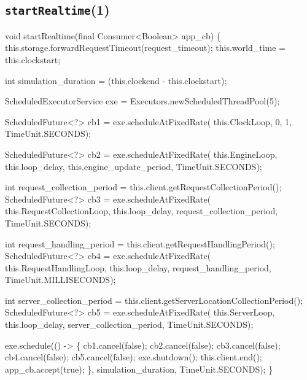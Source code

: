 \subsection{{\tt{}\protect{}startRealtime}(1)}
\nwenddocs{}\endmoddef{}
void startRealtime(final Consumer<Boolean> app_cb) \{
  this.storage.forwardRequestTimeout(request_timeout);
  this.world_time = this.clockstart;

  int simulation_duration = (this.clockend - this.clockstart);

  ScheduledExecutorService exe = Executors.newScheduledThreadPool(5);

  ScheduledFuture<?> cb1 = exe.scheduleAtFixedRate(
    this.ClockLoop, 0, 1, TimeUnit.SECONDS);

  ScheduledFuture<?> cb2 = exe.scheduleAtFixedRate(
    this.EngineLoop, this.loop_delay, this.engine_update_period, TimeUnit.SECONDS);

  int request_collection_period = this.client.getRequestCollectionPeriod();
  ScheduledFuture<?> cb3 = exe.scheduleAtFixedRate(
    this.RequestCollectionLoop, this.loop_delay, request_collection_period, TimeUnit.SECONDS);

  int request_handling_period = this.client.getRequestHandlingPeriod();
  ScheduledFuture<?> cb4 = exe.scheduleAtFixedRate(
    this.RequestHandlingLoop, this.loop_delay, request_handling_period, TimeUnit.MILLISECONDS);

  int server_collection_period = this.client.getServerLocationCollectionPeriod();
  ScheduledFuture<?> cb5 = exe.scheduleAtFixedRate(
    this.ServerLoop, this.loop_delay, server_collection_period, TimeUnit.SECONDS);

  exe.schedule(() -> \{
    cb1.cancel(false);
    cb2.cancel(false);
    cb3.cancel(false);
    cb4.cancel(false);
    cb5.cancel(false);
    exe.shutdown();
    this.client.end();
    app_cb.accept(true);
  \}, simulation_duration, TimeUnit.SECONDS);
\}
\eatline
{}\nwendcode{}\nwdocspar
